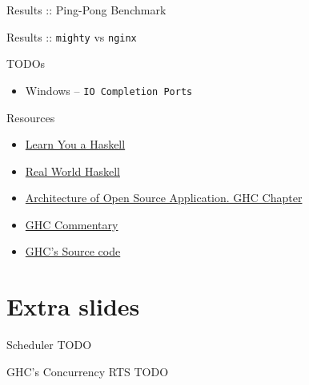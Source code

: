 \documentclass{beamer}
\begin{document}
\begin{frame}{Results :: Ping-Pong Benchmark}
  \centering
\end{frame}

\begin{frame}{Results :: \texttt{mighty} vs \texttt{nginx}}
  \centering
\end{frame}

\begin{frame}{TODOs}
  \begin{itemize}
    \item Windows \pause -- \texttt{IO Completion Ports}
  \end{itemize}
\end{frame}

\begin{frame}{Resources}
  \begin{itemize}
    \item \href{http://learnyouahaskell.com/}{Learn You a Haskell}
    \item \href{http://book.realworldhaskell.org/read/}{Real World Haskell}
    \item \href{http://www.aosabook.org/en/ghc.html}{Architecture of Open Source Application. GHC Chapter}
    \item \href{http://hackage.haskell.org/trac/ghc/wiki/Commentary}{GHC Commentary}
    \item \href{https://github.com/ghc/ghc}{GHC's Source code}
  \end{itemize}
\end{frame}

\section{Extra slides}
\frame{\tableofcontents[currentsection]}

\begin{frame}{Scheduler}
  TODO
\end{frame}

\begin{frame}{GHC's Concurrency RTS}
  TODO
\end{frame}
\end{document}
